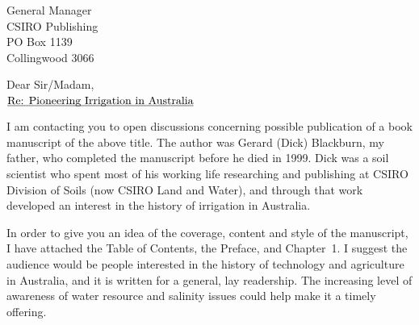 \documentclass[a4paper,11pt]{letter}
\def\undertext#1{$\underline{\smash{\hbox{#1}}}$}
\begin{document}
\signature{\vspace*{-10mm}
\texttt{[image: hmbsig.ps]}\\
\undertext{Dr Hugh M. Blackburn}}
\begin{letter}{
General Manager\\CSIRO Publishing\\PO Box 1139\\Collingwood 3066
}
\address{Dr Hugh M. Blackburn\\40 Murphy St\\Brighton
3186\\(03)\,9252\,6330~(w)\\hugh.blackburn@csiro.au} \date{15 June
2002}\opening{Dear Sir/Madam,}

\begin{center}\textbf{\undertext{Re: Pioneering Irrigation in Australia}}
\end{center}

I am contacting you to open discussions concerning possible
publication of a book manuscript of the above title. The author was
Gerard (Dick) Blackburn, my father, who completed the manuscript
before he died in 1999.  Dick was a soil scientist who spent most of
his working life researching and publishing at CSIRO Division of Soils
(now CSIRO Land and Water), and through that work developed an
interest in the history of irrigation in Australia.

In order to give you an idea of the coverage, content and style of the
manuscript, I have attached the Table of Contents, the Preface, and
Chapter~1.  I suggest the audience would be people interested in the
history of technology and agriculture in Australia, and it is written
for a general, lay readership.  The increasing level of awareness of
water resource and salinity issues could help make it a timely
offering.


\end{letter}
\end{document}

